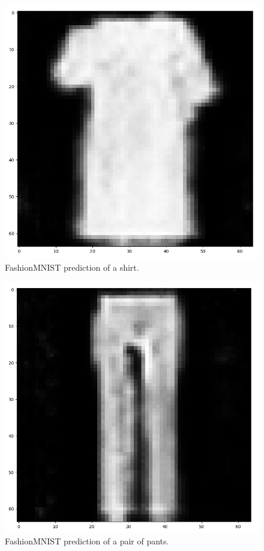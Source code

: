 \documentclass[10pt,twocolumn,letterpaper]{article}
\begin{document}
\begin{figure}[h!t]
   \centering
   \includegraphics[scale=0.39]{images/shirt.png}
   \caption{FashionMNIST prediction of a shirt.}
   \label{fig:fashion-shirt}
\end{figure}

\begin{figure}[h!t]
   \centering
   \includegraphics[scale=0.39]{images/pants.png}
   \caption{FashionMNIST prediction of a pair of pants.}
   \label{fig:fashion-pants}
\end{figure}
\end{document}
